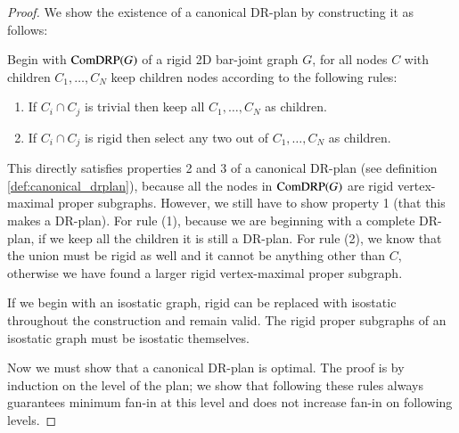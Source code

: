 \begin{proof}
We show the existence of a canonical DR-plan by constructing it as follows:

Begin with $\text{ComDRP}(G)$ of a rigid 2D bar-joint graph $G$, for all nodes $C$ with children $C_1,\ldots,C_N$ keep children nodes according to the following rules:
\begin{enumerate}
   \item If $C_i \cap C_j$ is trivial then keep all $C_1,\ldots,C_N$ as children.
   \item If $C_i \cap C_j$ is rigid then select any two out of $C_1,\ldots,C_N$ as children.
\end{enumerate}

This directly satisfies properties 2 and 3 of a canonical DR-plan (see definition \ref{def:canonical_drplan}), because all the nodes in $\text{ComDRP}(G)$ are rigid vertex-maximal proper subgraphs. However, we still have to show property 1 (that this makes a DR-plan).
For rule (1), because we are beginning with a complete DR-plan, if we keep all the children it is still a DR-plan. For rule (2), we know that the union must be rigid as well and it cannot be anything other than $C$, otherwise we have found a larger rigid vertex-maximal proper subgraph.

If we begin with an isostatic graph, rigid can be replaced with isostatic throughout the construction and remain valid. The rigid proper subgraphs of an isostatic graph must be isostatic themselves.

Now we must show that a canonical DR-plan is optimal. The proof is by induction on the level of the plan; we show that following these rules always guarantees minimum fan-in at this level and does not increase fan-in on following levels.









\end{proof}
